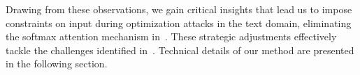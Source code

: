 %





Drawing from these observations, we gain critical insights that lead us to impose constraints on input during optimization attacks in the text domain, eliminating the softmax attention mechanism in~\cite{song2020information}. These strategic adjustments effectively tackle the challenges identified in~\cite{song2020information}.  Technical details of our method are presented in the following section. 





